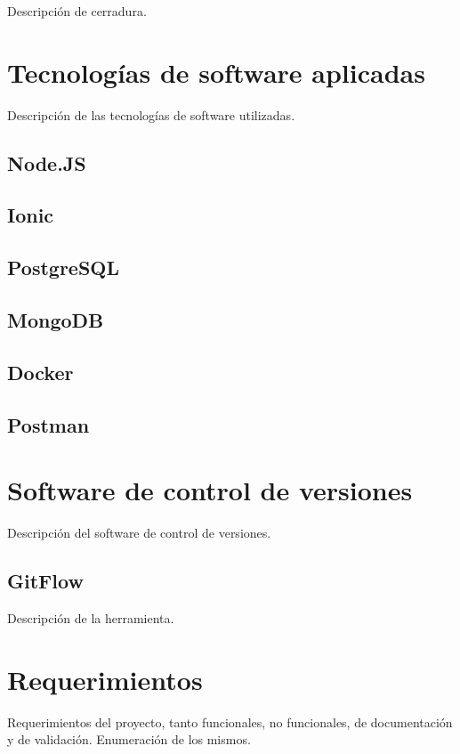 Descripción de cerradura.

\section{Tecnologías de software aplicadas}
 
Descripción de las tecnologías de software utilizadas.

\subsection{Node.JS}
\subsection{Ionic}
\subsection{PostgreSQL}
\subsection{MongoDB}
\subsection{Docker}
\subsection{Postman}


\section{Software de control de versiones}

Descripción del software de control de versiones.

\subsection{GitFlow}

Descripción de la herramienta.

\section{Requerimientos}\label{sec:Requerimientos}
 
Requerimientos del proyecto, tanto funcionales, no funcionales, de documentación y de validación. Enumeración de los mismos.
 
